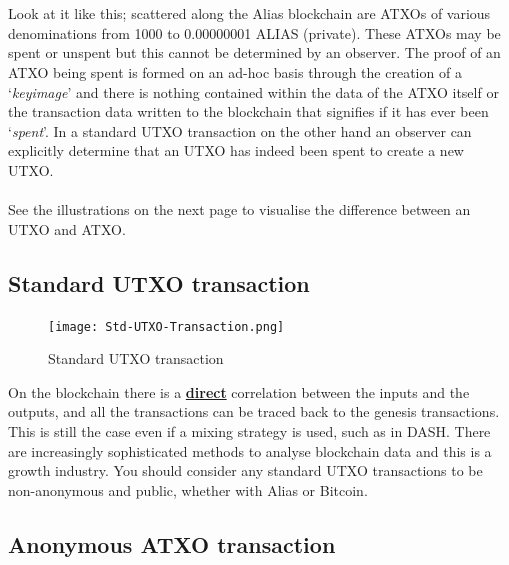 \\
\\
\noindent
Look at it like this; scattered along the Alias blockchain are ATXOs of
various denominations from 1000 to 0.00000001 ALIAS (private). These ATXOs may be spent
or unspent but this cannot be determined by an observer. The proof of an ATXO
being spent is formed on an ad-hoc basis through the creation of a ‘\textit{keyimage}’
and there is nothing contained within the data of the ATXO itself or the
transaction data written to the blockchain that signifies if it has ever been
‘\textit{spent}’. In a standard UTXO transaction on the other hand an observer can
explicitly determine that an UTXO has indeed been spent to create a new UTXO.
\\
\\
\noindent
See the illustrations on the next page to visualise the difference between an
UTXO and ATXO.
\newpage



\subsection{Standard UTXO transaction}

\begin{figure}[ht]
	\centering
	\texttt{[image: Std-UTXO-Transaction.png]}
	\caption{Standard UTXO transaction}
\end{figure}

\noindent
On the blockchain there is a \textbf{\underline{direct}} correlation
between the inputs and the outputs, and all the transactions can be 
traced back to the genesis transactions. This is still the case even 
if a mixing strategy is used, such as in DASH. There are increasingly 
sophisticated methods to analyse blockchain data and this is a growth 
industry. You should consider any standard UTXO transactions to be 
non-anonymous and public, whether with Alias or Bitcoin.



\subsection{Anonymous ATXO transaction}


